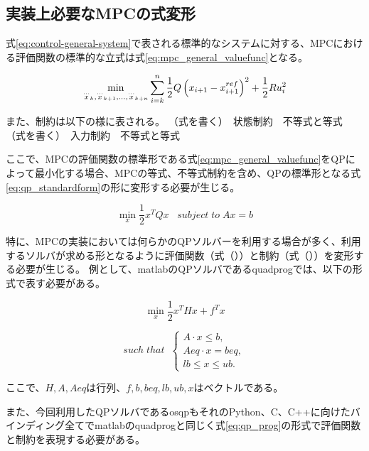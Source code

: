 \subsection{実装上必要なMPCの式変形}
式\eqref{eq:control-general-system}で表される標準的なシステムに対する、MPCにおける評価関数の標準的な立式は式\eqref{eq:mpc_general_valuefunc}となる。

\begin{equation}
  \min_{{\buildrel\ldots\over{x}}_{k},{\buildrel\ldots\over{x}}_{k+1},\ldots,{\buildrel\ldots\over{x}}_{k+n}}\sum_{i=k}^{n}{1\over 2}Q\left(x_{i+1}-x_{i+1}^{ref}\right)^{2}+{1\over 2}R{u}_{i}^{2}
  \label{eq:mpc_general_valuefunc}
\end{equation}

また、制約は以下の様に表される。
（式を書く）　状態制約　不等式と等式
（式を書く）　入力制約　不等式と等式

ここで、MPCの評価関数の標準形である式\eqref{eq:mpc_general_valuefunc}をQPによって最小化する場合、MPCの等式、不等式制約を含め、QPの標準形となる式\eqref{eq:qp_standardform}の形に変形する必要が生じる。

\begin{equation}
  \underset{x}{\min} \frac{1}{2}x^TQx \;\;\; subject \; to \; Ax = b
  \label{eq:qp_standardform}
\end{equation}

特に、MPCの実装においては何らかのQPソルバーを利用する場合が多く、利用するソルバが求める形となるように評価関数（式（））と制約（式（））を変形する必要が生じる。
例として、matlab\cite{MATLAB:2021}のQPソルバであるquadprog\cite{MATLABQUADPLOG}では、以下の形式で表す必要がある。

\begin{equation}
  \underset{x}{\min} \frac{1}{2}x^THx + f^Tx
  \label{eq:qp_prog}
\end{equation}

\begin{equation}
  such \; that \;\;
  \begin{cases}
    A \cdot x \leq b,  \\
    Aeq \cdot x = beq, \\
    lb \leq x \leq ub.
  \end{cases}
  \label{eq:qp_constraint}
\end{equation}

ここで、$H,A,Aeq$は行列、$f,b,beq,lb,ub,x$はベクトルである。

また、今回利用したQPソルバであるosqp\cite{OSQP}もそれのPython、C、C++に向けたバインディング全てでmatlabのquadprogと同じく式\eqref{eq:qp_prog}の形式で評価関数と制約を表現する必要がある。

